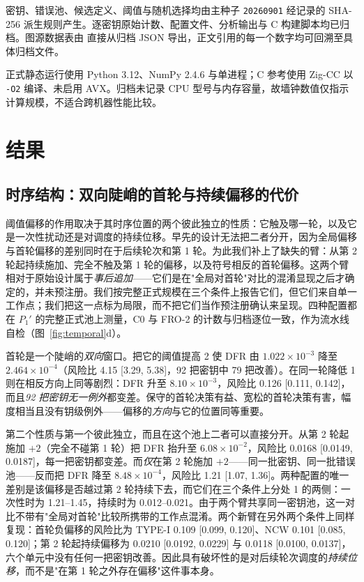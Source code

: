 \documentclass[UTF8,a4paper,10pt,twocolumn]{ctexart}
\begin{document}
密钥、错误池、候选定义、阈值与随机选择均由主种子 \texttt{20260901} 经记录的 SHA-256 派生规则产生。逐密钥原始计数、配置文件、分析输出与 C 构建脚本均已归档。图源数据表由  直接从归档 JSON 导出，正文引用的每一个数字均可回溯至具体归档文件。

正式静态运行使用 Python 3.12、NumPy 2.4.6 与单进程；C 参考使用 Zig-CC 以 \texttt{-O2} 编译、未启用 AVX。归档未记录 CPU 型号与内存容量，故墙钟数值仅指示计算规模，不适合跨机器性能比较。

\section{结果}\label{sec:results}

\subsection{时序结构：双向陡峭的首轮与持续偏移的代价}\label{sec:temporal}

阈值偏移的作用取决于其时序位置的两个彼此独立的性质：它触及哪一轮，以及它是一次性扰动还是对调度的持续位移。早先的设计无法把二者分开，因为全局偏移与首轮偏移的差别同时在于后续轮次和第 1 轮。为此我们补上了缺失的臂：从第 2 轮起持续施加、完全不触及第 1 轮的偏移，以及符号相反的首轮偏移。这两个臂相对于原始设计属于\emph{事后追加}——它们是在"全局对首轮"对比的混淆显现之后才确定的，并未预注册。我们按完整正式规模在三个条件上报告它们，但它们来自单一工作点；我们把这一点标为局限，而不把它们当作预注册确认来呈现。四种配置都在 $P_1'$ 的完整正式池上测量，C0 与 FRO-2 的计数与归档逐位一致，作为流水线自检（图~\ref{fig:temporal}d）。

首轮是一个陡峭的\emph{双向}窗口。把它的阈值提高 2 使 DFR 由 $1.022\times10^{-3}$ 降至 $2.464\times10^{-4}$（风险比 4.15 [3.29, 5.38]，92 把密钥中 79 把改善）。在同一轮降低 1 则在相反方向上同等剧烈：DFR 升至 $8.10\times10^{-3}$，风险比 0.126 [0.111, 0.142]，而且\emph{92 把密钥无一例外}都变差。保守的首轮决策有益、宽松的首轮决策有害，幅度相当且没有钥级例外——偏移的\emph{方向}与它的位置同等重要。

第二个性质与第一个彼此独立，而且在这个池上二者可以直接分开。从第 2 轮起施加 $+2$（完全不碰第 1 轮）把 DFR 抬升至 $6.08\times10^{-2}$，风险比 0.0168 [0.0149, 0.0187]，每一把密钥都变差。而\emph{仅}在第 2 轮施加 $+2$——同一批密钥、同一批错误池——反而把 DFR 降至 $8.48\times10^{-4}$，风险比 1.21 [1.07, 1.36]。两种配置的唯一差别是该偏移是否越过第 2 轮持续下去，而它们在三个条件上分处 1 的两侧：一次性时为 1.21--1.45，持续时为 0.012--0.021。由于两个臂共享同一密钥池，这一对比不带有"全局对首轮"比较所携带的工作点混淆。两个新臂在另外两个条件上同样复现：首轮负偏移的风险比为 TYPE-I 0.109 [0.099, 0.120]、NCW 0.101 [0.085, 0.120]；第 2 轮起持续偏移为 0.0210 [0.0192, 0.0229] 与 0.0118 [0.0100, 0.0137]，六个单元中没有任何一把密钥改善。因此具有破坏性的是对后续轮次调度的\emph{持续位移}，而不是"在第 1 轮之外存在偏移"这件事本身。
\end{document}
